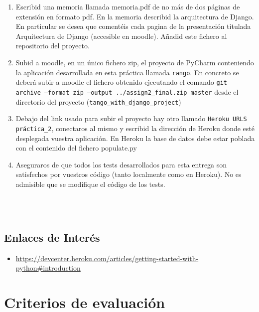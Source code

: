 \documentclass[12pt]{article} %
\begin{document}
\begin{minipage}{\linewidth}
\begin{framed}
\begin{enumerate}
 \item Escribid una memoria llamada memoria.pdf de no más de dos páginas de extensión en formato pdf. En la memoria describid la arquitectura de Django. En particular se desea que comentéis cada pagina de la presentación titulada Arquitectura de Django (accesible en moodle). Añadid este fichero al repositorio del proyecto.

\item Subid a moodle, en un único fichero zip, el proyecto de PyCharm conteniendo la aplicación desarrollada en esta práctica llamada \texttt{rango}. En concreto se deberá subir a moodle el fichero obtenido ejecutando el comando \texttt{git archive --format zip --output ../assign2\_final.zip  master} desde el directorio del proyecto (\texttt{tango\_with\_django\_project})

\item Debajo del link usado para subir el proyecto hay otro llamado \texttt{Heroku URLS práctica\_2}, conectaros al mismo y escribid la dirección de Heroku donde esté desplegada vuestra aplicación. En Heroku la base de datos debe estar poblada con el contenido del fichero populate.py

\item  Aseguraros de que todos los tests desarrollados para esta entrega son satisfechos por vuestros código (tanto localmente como en Heroku). No es admisible que se modifique el código de los tests.

\end{enumerate}
\end{framed}
\end{minipage}\\\\

\subsection{Enlaces de Interés}

\begin{itemize}
 \item \url{https://devcenter.heroku.com/articles/getting-started-with-python#introduction}
\end{itemize}


\section{Criterios de evaluación}
\end{document}
